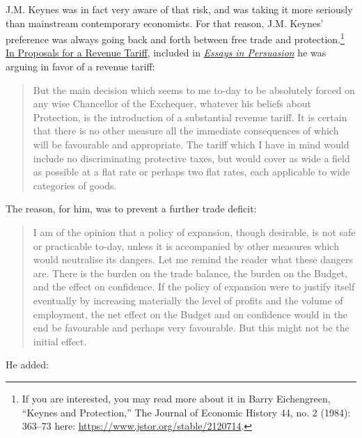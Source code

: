 \documentclass[]{book}
\let\rmarkdownfootnote\footnote%
\def\footnote{\protect\rmarkdownfootnote}
\begin{document}
J.M. Keynes was in fact very aware of that risk, and was taking it more
seriously than mainstream contemporary economists. For that reason, J.M.
Keynes' preference was always going back and forth between free trade
and protection.\footnote{If you are interested, you may read more about
  it in Barry Eichengreen, ``Keynes and Protection,'' The Journal of
  Economic History 44, no. 2 (1984): 363--73 here:
  \url{https://www.jstor.org/stable/2120714}.}
\href{https://en.wikisource.org/wiki/Essays_in_Persuasion/Proposals_for_a_Revenue_Tariff}{In
Proposals for a Revenue Tariff}, included in
\href{https://en.wikisource.org/wiki/Essays_in_Persuasion}{\emph{Essays
in Persuasion}} he was arguing in favor of a revenue tariff:

\begin{quote}
But the main decision which seems to me to-day to be absolutely forced
on any wise Chancellor of the Exchequer, whatever his beliefs about
Protection, is the introduction of a substantial revenue tariff. It is
certain that there is no other measure all the immediate consequences of
which will be favourable and appropriate. The tariff which I have in
mind would include no discriminating protective taxes, but would cover
as wide a field as possible at a flat rate or perhaps two flat rates,
each applicable to wide categories of goods.
\end{quote}

The reason, for him, was to prevent a further trade deficit:

\begin{quote}
I am of the opinion that a policy of expansion, though desirable, is not
safe or practicable to-day, unless it is accompanied by other measures
which would neutralise its dangers. Let me remind the reader what these
dangers are. There is the burden on the trade balance, the burden on the
Budget, and the effect on confidence. If the policy of expansion were to
justify itself eventually by increasing materially the level of profits
and the volume of employment, the net effect on the Budget and on
confidence would in the end be favourable and perhaps very favourable.
But this might not be the initial effect.
\end{quote}

He added:
\end{document}
